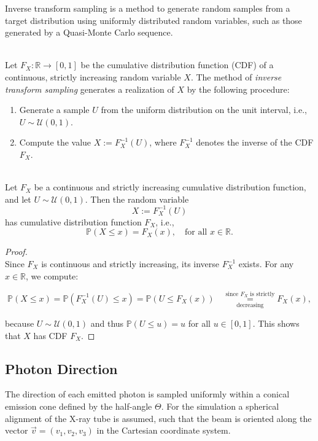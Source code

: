 Inverse transform sampling \cite{muller2012monte} is a method to generate random samples from a target distribution using uniformly distributed random variables, such as those generated by a Quasi-Monte Carlo sequence.

\begin{definition}\ \\
    \label{def:inverse_transform_sampling}
    Let $F_X: \mathbb{R} \to [0,1]$ be the cumulative distribution function (CDF) of a continuous, strictly increasing random variable $X$. The method of \emph{inverse transform sampling} generates a realization of $X$ by the following procedure:

    \begin{enumerate}
        \item Generate a sample $U$ from the uniform distribution on the unit interval, i.e., $U \sim \mathcal{U}(0,1)$.
        \item Compute the value $X := F_X^{-1}(U)$, where $F_X^{-1}$ denotes the inverse of the CDF $F_X$.
    \end{enumerate}
\end{definition}

\begin{theorem}\ \\
Let $F_X$ be a continuous and strictly increasing cumulative distribution function, and let $U \sim \mathcal{U}(0,1)$. Then the random variable
\[
X := F_X^{-1}(U)
\]
has cumulative distribution function $F_X$, i.e.,
\[
\mathbb{P}(X \leq x) = F_X(x), \quad \text{for all } x \in \mathbb{R}.
\]
\end{theorem}

\begin{proof}\ \\
Since $F_X$ is continuous and strictly increasing, its inverse $F_X^{-1}$ exists. For any $x \in \mathbb{R}$, we compute:

\[
\mathbb{P}(X \leq x) = \mathbb{P}(F_X^{-1}(U) \leq x)
= \mathbb{P}(U \leq F_X(x)) \quad  \underset{\text{decreasing}}{\overset{\text{since } F_X \text{ is strictly}}{=}} F_X(x),
\]

because \( U \sim \mathcal{U}(0,1) \) and thus \( \mathbb{P}(U \leq u) = u \) for all \( u \in [0,1] \). This shows that \( X \) has CDF \( F_X \).
\end{proof}


\subsection*{Photon Direction}
The direction of each emitted photon is sampled uniformly within a conical
emission cone defined by the half-angle $\Theta$. For the simulation a spherical alignment of the X-ray tube is assumed, such that the beam is oriented along the vector $\vec{v} = (v_1,v_2,v_3)$ in the Cartesian coordinate system.

